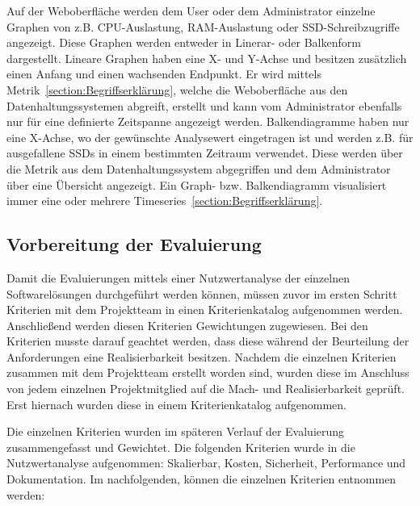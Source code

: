 Auf der Weboberfläche werden dem User oder dem Administrator einzelne Graphen
von z.B. CPU\hyp{}Auslastung, RAM\hyp{}Auslastung oder SSD\hyp{}Schreibzugriffe
angezeigt. Diese Graphen werden entweder in Linerar- oder Balkenform
dargestellt. Lineare Graphen haben eine X- und Y\hyp{}Achse und besitzen
zusätzlich einen Anfang und einen wachsenden Endpunkt. Er wird mittels
Metrik~\ref{section:Begriffserklärung}, welche die Weboberfläche aus den
Datenhaltungssystemen abgreift, erstellt und kann vom Administrator ebenfalls
nur für eine definierte Zeitspanne angezeigt werden. Balkendiagramme haben nur
eine X\hyp{}Achse, wo der gewünschte Analysewert eingetragen ist und werden
z.B. für ausgefallene SSDs in einem bestimmten Zeitraum verwendet. Diese werden
über die Metrik aus dem Datenhaltungssystem abgegriffen und dem Administrator
über eine Übersicht angezeigt. Ein Graph- bzw. Balkendiagramm visualisiert
immer eine oder mehrere Timeseries~\ref{section:Begriffserklärung}.

\subsection{Vorbereitung der Evaluierung}
\label{subsec:vorbereiten_der_evaluierung_datenvisualisierung}
Damit die Evaluierungen mittels einer Nutzwertanalyse der einzelnen
Softwarelösungen durchgeführt werden können, müssen zuvor im ersten Schritt
Kriterien mit dem Projektteam in einen Kriterienkatalog aufgenommen werden.
Anschließend werden diesen Kriterien Gewichtungen zugewiesen. Bei den Kriterien
musste darauf geachtet werden, dass diese während der Beurteilung der
Anforderungen eine Realisierbarkeit besitzen. Nachdem die einzelnen Kriterien
zusammen mit dem Projektteam erstellt worden sind, wurden diese im Anschluss
von jedem einzelnen Projektmitglied auf die Mach- und Realisierbarkeit geprüft.
Erst hiernach wurden diese in einem Kriterienkatalog aufgenommen.

Die einzelnen Kriterien wurden im späteren Verlauf der Evaluierung
zusammengefasst und Gewichtet. Die folgenden Kriterien wurde in die
Nutzwertanalyse aufgenommen: Skalierbar, Kosten, Sicherheit, Performance und
Dokumentation. Im nachfolgenden, können die einzelnen Kriterien entnommen
werden:

